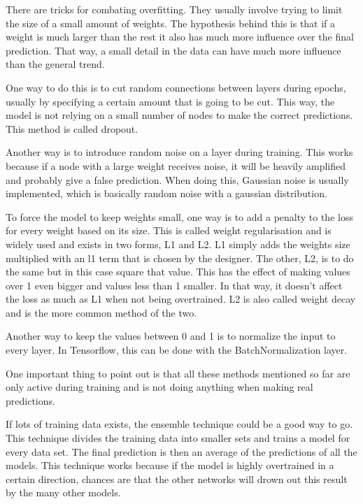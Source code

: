 \cite{overfitting}

There are tricks for combating overfitting. They usually involve trying to limit the size of a small amount of weights.
The hypothesis behind this is that if a weight is much larger than the rest it also has much more influence over the final prediction. That way, a small detail in the data can have much more influence than the general trend.

One way to do this is to cut random connections between layers during epochs, usually by specifying a certain amount that is going to be cut.
This way, the model is not relying on a small number of nodes to make the correct predictions. This method is called dropout.

Another way is to introduce random noise on a layer during training. This works because if a node with a large weight receives noise, it will be heavily amplified and probably give a false prediction.
When doing this, Gaussian noise is usually implemented, which is basically random noise with a gaussian distribution.

To force the model to keep weights small, one way is to add a penalty to the loss for every weight based on its size. 
This is called weight regularisation and is widely used and exists in two forms, L1 and L2.
L1 simply adds the weights size multiplied with an l1 term that is chosen by the designer.
The other, L2, is to do the same but in this case square that value. This has the effect of making values over 1 even bigger and values less than 1 smaller.
In that way, it doesn't affect the loss as much as L1 when not being overtrained. L2 is also called weight decay and is the more common method of the two.

Another way to keep the values between 0 and 1 is to normalize the input to every layer. In Tensorflow, this can be done with the BatchNormalization layer.

One important thing to point out is that all these methods mentioned so far are only active during training and is not doing anything when making real predictions.


If lots of training data exists, the ensemble technique could be a good way to go. This technique divides the training data into smaller sets and trains a model for every data set.
The final prediction is then an average of the predictions of all the models. This technique works because if the model is highly overtrained in a certain direction, chances are that the other networks will drown out this result by the many other models.

